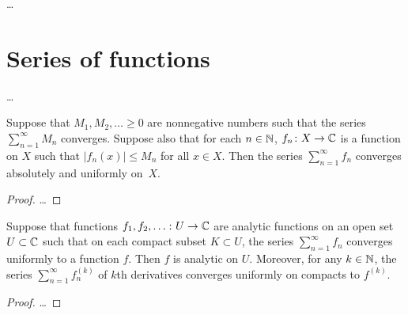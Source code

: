 \begin{definition}
  \label{def:complex_series}
  \ldots
\end{definition}



\section{Series of functions}

\begin{definition}
  \label{def:function_series}
  \ldots
\end{definition}

\begin{lemma}
  \label{lem:weierstrass_test}
  Suppose that $M_1,M_2,\ldots \ge 0$ are nonnegative
  numbers such that the series $\sum_{n=1}^\infty M_n$ converges.
  Suppose also that for each $n \in \mathbb{N}$,
  $f_n \colon X \to \mathbb{C}$ is a function on $X$
  such that $|f_n(x)| \le M_n$ for all $x \in X$.
  Then the series $\sum_{n=1}^\infty f_n$
  converges absolutely and uniformly on~$X$.
\end{lemma}
\begin{proof}
  \ldots
\end{proof}

\begin{lemma}
  \label{lem:uoc_convergent_analytic_series}
  Suppose that functions $f_1, f_2, \ldots \colon U \to \mathbb{C}$
  are analytic functions on an open set $U \subset \mathbb{C}$
  such that on each compact subset $K \subset U$, the series
  $\sum_{n=1}^\infty f_n$ converges uniformly to a
  function $f$. Then $f$ is analytic on $U$.
  Moreover, for any $k \in \mathbb{N}$, the series $\sum_{n=1}^\infty f^{(k)}_n$
  of $k$th derivatives converges uniformly on compacts to $f^{(k)}$.
\end{lemma}
\begin{proof}
  \ldots
\end{proof}



